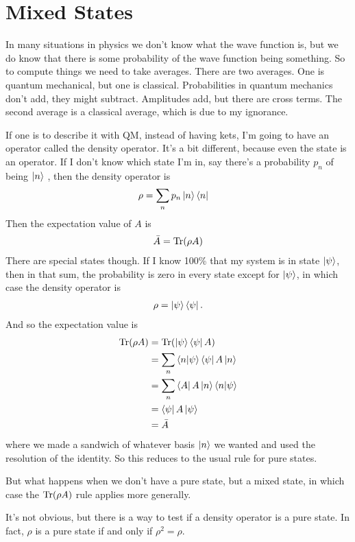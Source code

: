 \section{Mixed States}
In many situations in physics we don't know what the wave function is,
but we do know that there is some probability of the wave function being
something.
So to compute things we need to take averages.
There are two averages.
One is quantum mechanical, but one is classical.
Probabilities in quantum mechanics don't add,
they might subtract.
Amplitudes add,
but there are cross terms.
The second average is a classical average,
which is due to my ignorance.

If one is to describe it with QM,
instead of having kets,
I'm going to have an operator called the density operator.
It's a bit different,
because even the state is an operator.
If I don't know which state I'm in,
say there's a probability $p_n$ of being $\ket{n}$ ,
then the density operator is
\begin{align}
    \rho &= \sum_{n} p_n \ket{n}\bra{n}
\end{align}
Then the expectation value of $A$ is
\begin{align}
    \bar{A} = \Tr(\rho A)
\end{align}
There are special states though.
If I know 100\% that my system is in state $\ket{\psi}$,
then in that sum,
the probability is zero in every state except for $\ket{\psi}$,
in which case the density operator is
\begin{align}
    \rho = \ket{\psi}\bra{\psi}.
\end{align}
And so the expectation value is
\begin{align}
    \Tr(\rho A) &=
    \Tr(\ket{\psi}\bra{\psi} A)\\
    &= \sum_n \braket{n}{\psi} \bra{\psi}A\ket{n}\\
    &= \sum_n \bra{A}A\ket{n}\braket{n}{\psi}\\
    &= \bra{\psi}A\ket{\psi}\\
    &= \bar{A}
\end{align}
where we made a sandwich of whatever basis $\ket{n}$ we wanted
and used the resolution of the identity.
So this reduces to the usual rule for pure states.

But what happens when we don't have a pure state,
but a mixed state,
in which case the $\Tr(\rho A)$ rule applies more generally.

It's not obvious, but there is a way to test if a density operator is a pure
state.
In fact,
$\rho$
is a pure state if and only if
$\rho^2 = \rho$.

